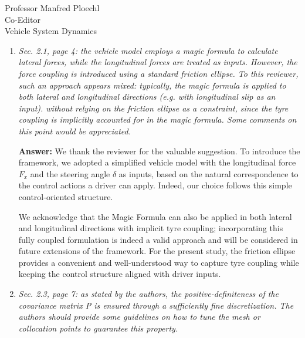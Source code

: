\documentclass{letter}
\begin{document}
\begin{letter}{Professor Manfred Ploechl\\
Co-Editor\\
Vehicle System Dynamics}
\begin{enumerate}
In further works we are actually planning to adopt more complex models and to parallelize the problem solution on multiple cores. This approach has been explored by our research group in previous works [...], where the nominal minumim lap-time problem was solved for a 14-DoF's multibody model.

Finally, since the reviewer has pointed out this specific feature, we would like to remark that, although the out-of-plane dynamics is neglected in our model, we took into account longitudinal load transfers.

\hrulefill

\item
\textit{Sec. 2.1, page 4: the vehicle model employs a magic formula to calculate lateral forces, while the longitudinal forces are treated as inputs. However, the force coupling is introduced using a standard friction ellipse. To this reviewer, such an approach appears mixed: typically, the magic formula is applied to both lateral and longitudinal directions (e.g. with longitudinal slip as an input). without relying on the friction ellipse as a constraint, since the tyre coupling is implicitly accounted for in the magic formula. Some comments on this point would be appreciated.}

\vspace{2mm}

\textbf{Answer:}
We thank the reviewer for the valuable suggestion.
To introduce the framework, we adopted a simplified vehicle model with the longitudinal force $F_x$ and the steering angle $\delta$ as inputs, based on the natural correspondence to the control actions a driver can apply. Indeed, our choice follows this simple control-oriented structure.

We acknowledge that the Magic Formula can also be applied in both lateral and longitudinal directions with implicit tyre coupling; incorporating this fully coupled formulation is indeed a valid approach and will be considered in future extensions of the framework. For the present study, the friction ellipse provides a convenient and well-understood way to capture tyre coupling while keeping the control structure aligned with driver inputs.


\hrulefill

\item
\textit{Sec. 2.3, page 7: as stated by the authors, the positive-definiteness of the covariance matrix P is ensured through a sufficiently fine discretization. The authors should provide some guidelines on how to tune the mesh or collocation points to guarantee this property.
}


\end{enumerate}
\end{letter}
\end{document}
